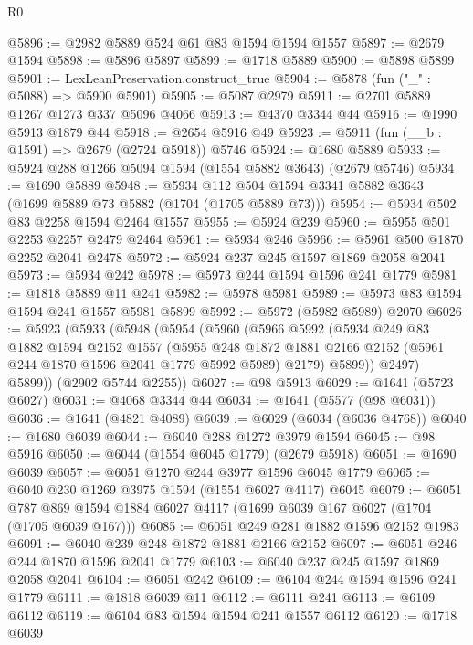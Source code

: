 \begin{lexlean}{R0}
\begin{coremodule}
@5896 := @2982 @5889 @524 @61 @83 @1594 @1594 @1557
@5897 := @2679 @1594
@5898 := @5896 @5897
@5899 := @1718 @5889
@5900 := @5898 @5899
@5901 := LexLeanPreservation.construct_true
@5904 := @5878 (fun ("_" : @5088) => @5900 @5901)
@5905 := @5087 @2979
@5911 := @2701 @5889 @1267 @1273 @337 @5096 @4066
@5913 := @4370 @3344 @44
@5916 := @1990 @5913 @1879 @44
@5918 := @2654 @5916 @49
@5923 := @5911 (fun (__b : @1591) => @2679 (@2724 @5918)) @5746
@5924 := @1680 @5889
@5933 := @5924 @288 @1266 @5094 @1594 (@1554 @5882 @3643) (@2679 @5746)
@5934 := @1690 @5889
@5948 := @5934 @112 @504 @1594 @3341 @5882 @3643 (@1699 @5889 @73 @5882 (@1704 (@1705 @5889 @73)))
@5954 := @5934 @502 @83 @2258 @1594 @2464 @1557
@5955 := @5924 @239
@5960 := @5955 @501 @2253 @2257 @2479 @2464
@5961 := @5934 @246
@5966 := @5961 @500 @1870 @2252 @2041 @2478
@5972 := @5924 @237 @245 @1597 @1869 @2058 @2041
@5973 := @5934 @242
@5978 := @5973 @244 @1594 @1596 @241 @1779
@5981 := @1818 @5889 @11 @241
@5982 := @5978 @5981
@5989 := @5973 @83 @1594 @1594 @241 @1557 @5981 @5899
@5992 := @5972 (@5982 @5989) @2070
@6026 := @5923
    (@5933
      (@5948
        (@5954
          (@5960
            (@5966
              @5992
              (@5934
                @249
                @83
                @1882
                @1594
                @2152
                @1557
                (@5955
                  @248
                  @1872
                  @1881
                  @2166
                  @2152
                  (@5961 @244 @1870 @1596 @2041 @1779 @5992 @5989)
                  @2179)
                @5899))
            @2497)
          @5899))
      (@2902 @5744 @2255))
@6027 := @98 @5913
@6029 := @1641 (@5723 @6027)
@6031 := @4068 @3344 @44
@6034 := @1641 (@5577 (@98 @6031))
@6036 := @1641 (@4821 @4089)
@6039 := @6029 (@6034 (@6036 @4768))
@6040 := @1680 @6039
@6044 := @6040 @288 @1272 @3979 @1594
@6045 := @98 @5916
@6050 := @6044 (@1554 @6045 @1779) (@2679 @5918)
@6051 := @1690 @6039
@6057 := @6051 @1270 @244 @3977 @1596 @6045 @1779
@6065 := @6040 @230 @1269 @3975 @1594 (@1554 @6027 @4117) @6045
@6079 := @6051 @787 @869 @1594 @1884 @6027 @4117 (@1699 @6039 @167 @6027 (@1704 (@1705 @6039 @167)))
@6085 := @6051 @249 @281 @1882 @1596 @2152 @1983
@6091 := @6040 @239 @248 @1872 @1881 @2166 @2152
@6097 := @6051 @246 @244 @1870 @1596 @2041 @1779
@6103 := @6040 @237 @245 @1597 @1869 @2058 @2041
@6104 := @6051 @242
@6109 := @6104 @244 @1594 @1596 @241 @1779
@6111 := @1818 @6039 @11
@6112 := @6111 @241
@6113 := @6109 @6112
@6119 := @6104 @83 @1594 @1594 @241 @1557 @6112
@6120 := @1718 @6039

\end{coremodule}
\end{lexlean}
